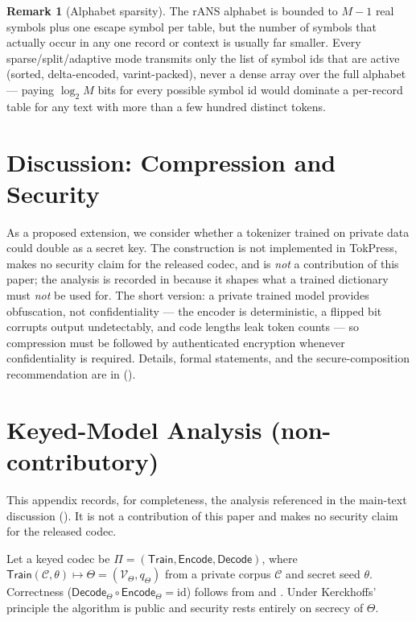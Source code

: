 \documentclass[10pt,twocolumn]{article}
\theoremstyle{plain}
\theoremstyle{definition}
\newtheorem{remark}[theorem]{Remark}
\newcommand{\V}{\mathcal{V}}
\begin{document}
\begin{remark}[Alphabet sparsity]
The rANS alphabet is bounded to $M{-}1$ real symbols plus one escape symbol per table,
but the number of symbols that actually occur in any one record or context is usually
far smaller. Every sparse/split/adaptive mode transmits only the list of symbol ids
that are active (sorted, delta-encoded, varint-packed), never a dense array over the
full alphabet --- paying $\log_2 M$ bits for every possible symbol id would dominate
a per-record table for any text with more than a few hundred distinct tokens.
\end{remark}


\section{Discussion: Compression and Security}\label{sec:keyed}

As a proposed extension, we consider whether a tokenizer trained on private data could
double as a secret key. The construction is not implemented in TokPress, makes no
security claim for the released codec, and is \emph{not} a contribution of this paper;
the analysis is recorded in  because it shapes what a trained
dictionary must \emph{not} be used for. The short version: a private trained model
provides obfuscation, not confidentiality --- the encoder is deterministic, a flipped
bit corrupts output undetectably, and code lengths leak token counts --- so
compression must be followed by authenticated encryption whenever confidentiality is
required. Details, formal statements, and the secure-composition recommendation are
in  ().

\section{Keyed-Model Analysis (non-contributory)}\label{app:keyed}

This appendix records, for completeness, the analysis referenced in the main-text
discussion (). It is not a contribution of this paper and makes no
security claim for the released codec.

Let a keyed codec be
$\Pi = (\mathsf{Train},\mathsf{Encode},\mathsf{Decode})$, where
$\mathsf{Train}(\mathcal{C},\theta) \mapsto \Theta = (\V_\Theta, q_\Theta)$ from a
private corpus $\mathcal{C}$ and secret seed $\theta$. Correctness
($\mathsf{Decode}_\Theta \circ \mathsf{Encode}_\Theta = \mathrm{id}$) follows from
 and . Under Kerckhoffs' principle the
algorithm is public and security rests entirely on secrecy of $\Theta$.
\end{document}
